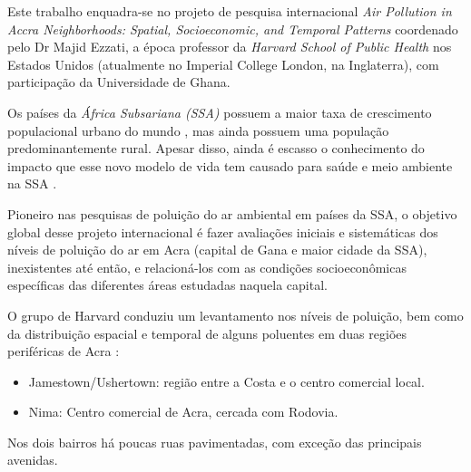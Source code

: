 Este trabalho enquadra-se no projeto de pesquisa internacional 
\textit{Air Pollution in Accra Neighborhoods: Spatial, Socioeconomic, and Temporal Patterns} 
coordenado pelo Dr Majid Ezzati, a época professor da \textit{Harvard School of Public Health} nos Estados Unidos (atualmente no Imperial College London, na Inglaterra),
com participação da Universidade de Ghana. 

Os países da \textit{África Subsariana (SSA)} possuem a maior taxa de crescimento 
populacional urbano do mundo \cite{united2006world}, mas ainda possuem uma população 
predominantemente rural. 
Apesar disso, ainda é escasso o conhecimento do impacto que esse novo modelo de vida 
tem causado para saúde e meio ambiente na SSA \cite{cohen2004urban}. 

Pioneiro nas pesquisas de poluição do ar ambiental em países da SSA, o objetivo 
global desse projeto internacional é fazer avaliações iniciais e sistemáticas 
dos níveis de poluição do ar em Acra (capital de Gana e maior cidade da SSA), 
inexistentes até então, e relacioná-los com as condições socioeconômicas 
específicas das diferentes áreas estudadas naquela capital.

O grupo de Harvard \citep{ARKU2008} conduziu um levantamento nos níveis de 
poluição, bem como da distribuição espacial e temporal de alguns poluentes 
em duas regiões periféricas de Acra \citep{DIONISIO2010}:

\begin{itemize}
  \item Jamestown/Ushertown: região entre a Costa e o centro comercial local.
  \item Nima: Centro comercial de Acra, cercada com Rodovia.
\end{itemize} 

Nos dois bairros há poucas ruas pavimentadas, com exceção das principais 
avenidas. 
